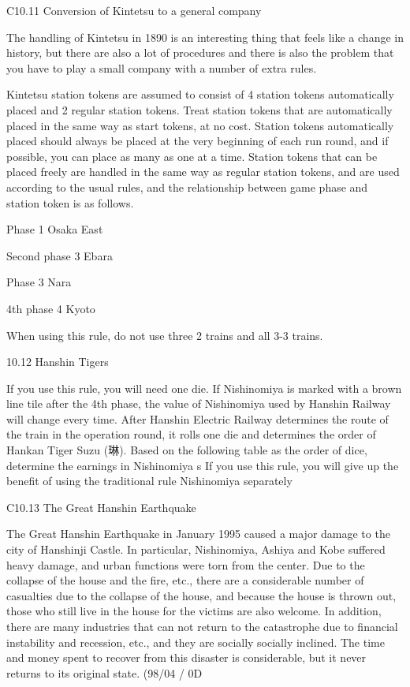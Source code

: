 \documentclass{article}
\begin{document}
\begin{CJK}{UTF8}{min}
C10.11 Conversion of Kintetsu to a general company

The handling of Kintetsu in 1890 is an interesting thing that feels like a change in history, but there are also a lot of procedures and there is also the problem that you have to play a small company with a number of extra rules.

Kintetsu station tokens are assumed to consist of 4 station tokens automatically placed and 2 regular station tokens. Treat station tokens that are automatically placed in the same way as start tokens, at no cost. Station tokens automatically placed should always be placed at the very beginning of each run round, and if possible, you can place as many as one at a time. Station tokens that can be placed freely are handled in the same way as regular station tokens, and are used according to the usual rules, and the relationship between game phase and station token is as follows.

Phase 1 Osaka East

Second phase 3 Ebara

Phase 3 Nara

4th phase 4 Kyoto

When using this rule, do not use three 2 trains and all 3-3 trains.

10.12 Hanshin Tigers

If you use this rule, you will need one die. If Nishinomiya is marked with a brown line tile after the 4th phase, the value of Nishinomiya used by Hanshin Railway will change every time. After Hanshin Electric Railway determines the route of the train in the operation round, it rolls one die and determines the order of Hankan Tiger Suzu (琳). Based on the following table as the order of dice, determine the earnings in Nishinomiya s If you use this rule, you will give up the benefit of using the traditional rule Nishinomiya separately

C10.13 The Great Hanshin Earthquake

The Great Hanshin Earthquake in January 1995 caused a major damage to the city of Hanshinji Castle. In particular, Nishinomiya, Ashiya and Kobe suffered heavy damage, and urban functions were torn from the center. Due to the collapse of the house and the fire, etc., there are a considerable number of casualties due to the collapse of the house, and because the house is thrown out, those who still live in the house for the victims are also welcome. In addition, there are many industries that can not return to the catastrophe due to financial instability and recession, etc., and they are socially socially inclined. The time and money spent to recover from this disaster is considerable, but it never returns to its original state. (98/04 / 0D


\end{CJK}
\end{document}

